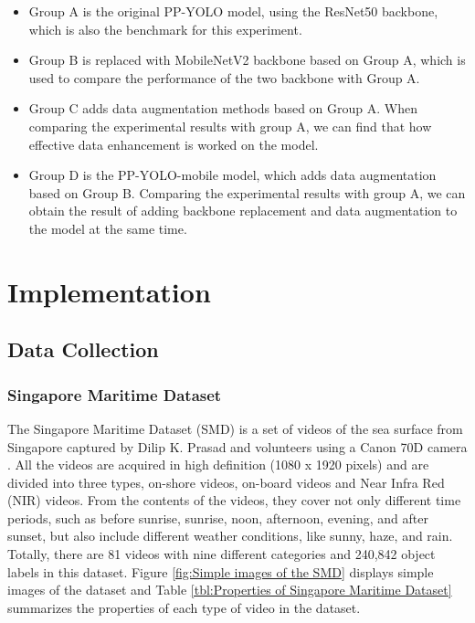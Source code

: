 \documentclass[journal,article,submit,moreauthors,pdftex]{Definitions/mdpi}
\begin{document}
\begin{itemize}
\item{Group A is the original PP-YOLO model, using the ResNet50 backbone, which is also the benchmark for this experiment.}
\end{itemize}


\begin{itemize}
\item{Group B is replaced with MobileNetV2 backbone based on Group A, which is used to compare the performance of the two backbone with Group A.}
\end{itemize}

\begin{itemize}
\item{Group C adds data augmentation methods based on Group A. When comparing the experimental results with group A, we can find that how effective data enhancement is worked on the model.}
\end{itemize}

\begin{itemize}
\item{Group D is the PP-YOLO-mobile model, which adds data augmentation based on Group B. Comparing the experimental results with group A, we can obtain the result of adding backbone replacement and data augmentation to the model at the same time.}
\end{itemize}


\section{Implementation}
\subsection{Data Collection}

\subsubsection{Singapore Maritime Dataset}
The Singapore Maritime Dataset (SMD) is a set of videos of the sea surface from Singapore captured by Dilip K. Prasad and volunteers using a Canon 70D camera \cite{prasad2017video}. All the videos are acquired in high definition (1080 x 1920 pixels) and are divided into three types, on-shore videos, on-board videos and Near Infra Red (NIR) videos. From the contents of the videos, they cover not only different time periods, such as before sunrise, sunrise, noon, afternoon, evening, and after sunset, but also include different weather conditions, like sunny, haze, and rain. Totally, there are 81 videos with nine different categories and 240,842 object labels in this dataset. Figure \ref{fig:Simple images of the SMD} displays simple images of the dataset and Table \ref{tbl:Properties of Singapore Maritime Dataset} summarizes the properties of each type of video in the dataset.
\end{document}
